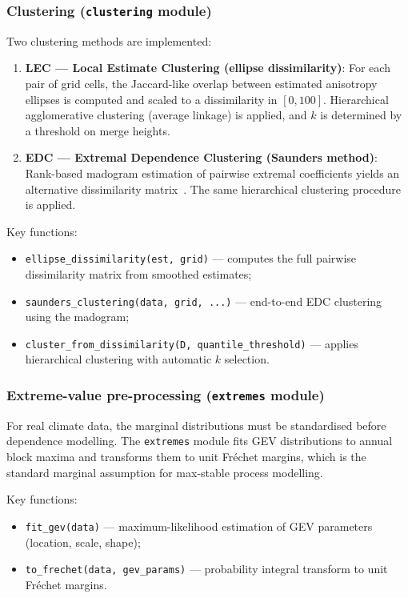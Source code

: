 \documentclass[a4paper]{elsarticle}
\begin{document}
\subsubsection{Clustering (\texttt{clustering} module)}

Two clustering methods are implemented:

\begin{enumerate}
\item \textbf{LEC --- Local Estimate Clustering (ellipse dissimilarity)}:
  For each pair of grid cells, the Jaccard-like overlap between
  estimated anisotropy ellipses is computed and scaled to a
  dissimilarity in $[0, 100]$.  Hierarchical agglomerative clustering
  (average linkage) is applied, and $k$ is determined by a threshold
  on merge heights.

\item \textbf{EDC --- Extremal Dependence Clustering (Saunders method)}:
  Rank-based madogram estimation of pairwise extremal coefficients
  yields an alternative dissimilarity
  matrix~\cite{saunders2021,cooley2006}.  The same hierarchical
  clustering procedure is applied.
\end{enumerate}

Key functions:
\begin{itemize}
\item \texttt{ellipse\_dissimilarity(est, grid)} --- computes the
  full pairwise dissimilarity matrix from smoothed estimates;
\item \texttt{saunders\_clustering(data, grid, ...)} --- end-to-end
  EDC clustering using the madogram;
\item \texttt{cluster\_from\_dissimilarity(D, quantile\_threshold)} ---
  applies hierarchical clustering with automatic $k$ selection.
\end{itemize}

\subsubsection{Extreme-value pre-processing (\texttt{extremes} module)}

For real climate data, the marginal distributions must be standardised
before dependence modelling.
The \texttt{extremes} module fits GEV distributions to annual block
maxima and transforms them to unit Fr\'{e}chet margins, which is
the standard marginal assumption for max-stable process modelling.

Key functions:
\begin{itemize}
\item \texttt{fit\_gev(data)} --- maximum-likelihood estimation of
  GEV parameters (location, scale, shape);
\item \texttt{to\_frechet(data, gev\_params)} --- probability
  integral transform to unit Fr\'{e}chet margins.
\end{itemize}
\end{document}
